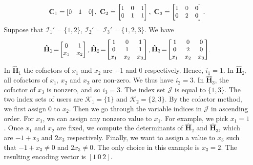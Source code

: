\documentclass[letterpaper,conference,10pt]{IEEEtran}
\begin{document}
\[ \small
 \mathbf{C}_1 = \begin{bmatrix}
 0 & 1 &0
 \end{bmatrix}, \
 \mathbf{C}_2 = \begin{bmatrix}
 1 & 0 & 1 \\
 0 & 1 & 1
 \end{bmatrix},
\ \mathbf{C}_3 = \begin{bmatrix}
1 & 0 & 0 \\
0 & 2 & 0
 \end{bmatrix}.
\]
Suppose that $\mathcal{I}_1' = \{1, 2\}$, $\mathcal{I}_2'=\mathcal{I}_3'=\{1,2,3\}$. We have
\[ {\small
  \mathbf{\hat H}_1\! =\! \begin{bmatrix}
 0 & 1  \\
 x_1 & x_2
 \end{bmatrix},
 \mathbf{\hat H}_2\! =\! \begin{bmatrix}
 1 & 0 & 1 \\
 0 & 1 & 1 \\
 x_1 & x_2 & x_3  \end{bmatrix},
\mathbf{\hat H}_3\! =\! \begin{bmatrix}
1 & 0 & 0 \\
0 & 2 & 0\\
 x_1 & x_2 & x_3 \end{bmatrix}}.
\]
In $\hat{\mathbf{H}}_1$ the cofactors of $x_1$ and $x_2$ are $-1$ and 0 respectively. Hence, $i_1 = 1$.  In $\hat{\mathbf{H}}_2$, all cofactors of $x_1$, $x_2$ and $x_3$ are non-zero. We thus have $i_2 = 3$. In $\hat{\mathbf{H}}_3$, the cofactor of $x_3$ is nonzero, and so $i_3=3$. The index set $\mathcal{J}$ is equal to $\{1,3\}$. The two index sets of users are $\mathcal{K}_1 = \{1\}$ and $\mathcal{K}_2 =\{2,3\}$.
By the cofactor method, we first assign  0 to $x_2$. Then we go through the variable indices in $\mathcal{J}$ in ascending order. For $x_1$, we can assign any nonzero value to $x_1$. For example, we pick $x_1 = 1$. Once $x_1$ and $x_2$ are fixed, we compute the determinants of $\hat{\mathbf{H}}_2$ and $\hat{\mathbf{H}}_3$, which are $-1+x_3$
and $2x_3$ respectively.
Finally, we want to assign a value to  $x_3$ such that $-1+x_3\neq 0$ and $2x_3\neq 0$. The only choice in this example is  $x_3=2$. The resulting encoding vector is $[1 \ 0 \ 2]$.

\smallskip
\end{document}
